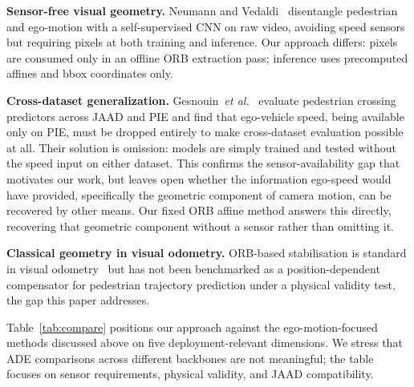\documentclass[conference]{IEEEtran}
\begin{document}
\textbf{Sensor-free visual geometry.}
Neumann and Vedaldi~\cite{neumann2021pedestrian} disentangle pedestrian and ego-motion with a self-supervised CNN on raw video, avoiding speed sensors but requiring pixels at both training and inference.
Our approach differs: pixels are consumed only in an offline ORB extraction pass; inference uses precomputed affines and bbox coordinates only.

\textbf{Cross-dataset generalization.}
Gesnouin~\textit{et al.}~\cite{gesnouin2022crossdataset} evaluate pedestrian crossing predictors across JAAD and PIE and find that ego-vehicle speed, being available only on PIE, must be dropped entirely to make cross-dataset evaluation possible at all. Their solution is omission: models are simply trained and tested without the speed input on either dataset. This confirms the sensor-availability gap that motivates our work, but leaves open whether the information ego-speed would have provided, specifically the geometric component of camera motion, can be recovered by other means. Our fixed ORB affine method answers this directly, recovering that geometric component without a sensor rather than omitting it.

\textbf{Classical geometry in visual odometry.}
ORB-based stabilisation is standard in visual odometry~\cite{rublee2011orb} but has not been benchmarked as a position-dependent compensator for pedestrian trajectory prediction under a physical validity test, the gap this paper addresses.

Table~\ref{tab:compare} positions our approach against the ego-motion-focused methods discussed above on five deployment-relevant dimensions.
We stress that ADE comparisons across different backbones are not meaningful; the table focuses on sensor requirements, physical validity, and JAAD compatibility.
\end{document}

